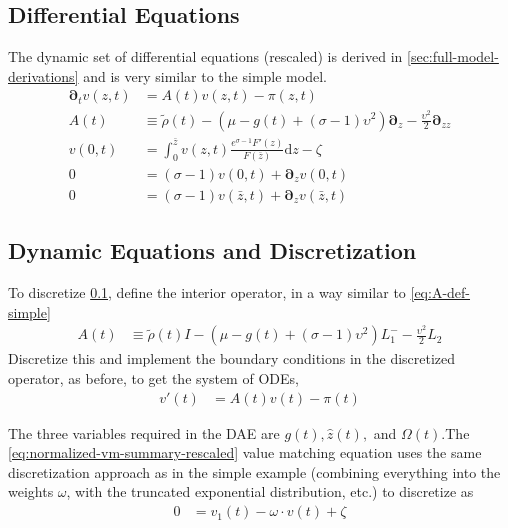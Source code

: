 \documentclass[11pt]{article}
\newcommand{\D}[1][]{\ensuremath{\boldsymbol{\partial}_{#1}}}
\newcommand{\diff}{\ensuremath{\mathrm{d}}}
\begin{document}
\subsection{Differential Equations}\label{sec:full-ODE}
The dynamic set of differential equations (rescaled) is derived in \cref{sec:full-model-derivations} and is very similar to the simple model.
\begin{align}
	\D[t]v(z,t) &= A(t)v(z,t) - \pi(z,t) \\
	A(t) &\equiv \tilde{\rho}(t)  - (\mu - g(t) + (\sigma - 1)\upsilon^2)\D[z] - \frac{\upsilon^2}{2}\D[zz]\\
	v(0,t) &= \int_{0}^{\bar{z}}v(z,t) \frac{e^{\sigma - 1}F'(z)}{F(\bar{z})} \diff z - \zeta\\
	0 &= (\sigma - 1)v(0,t) + \D[z]v(0,t)\\
	0 &= (\sigma - 1)v(\bar{z},t) + \D[z]v(\bar{z},t)
\end{align}




\subsection{Dynamic Equations and Discretization}
To discretize \cref{sec:full-ODE}, define the interior operator, in a way similar to \cref{eq:A-def-simple}
\begin{align}
	A(t) &\equiv \tilde{\rho}(t) I - (\mu - g(t) + (\sigma - 1)\upsilon^2) L^{-}_1 - \frac{\upsilon^2}{2} L_2\label{eq:A-def-full}
	\end{align}
Discretize this and implement the boundary conditions in the discretized operator, as before, to get the system of ODEs,
\begin{align}
	v'(t) &= A(t) v(t) - \pi(t)
\end{align}

The three variables required in the DAE are $g(t), \hat{z}(t),$ and $\Omega(t)$.The \cref{eq:normalized-vm-summary-rescaled} value matching equation uses the same discretization approach as in the simple example (combining everything into the weights $\omega$, with the truncated exponential distribution, etc.) to discretize as
\begin{align}
	0 &= v_1(t) - \omega \cdot v(t) + \zeta
\end{align}
\end{document}
